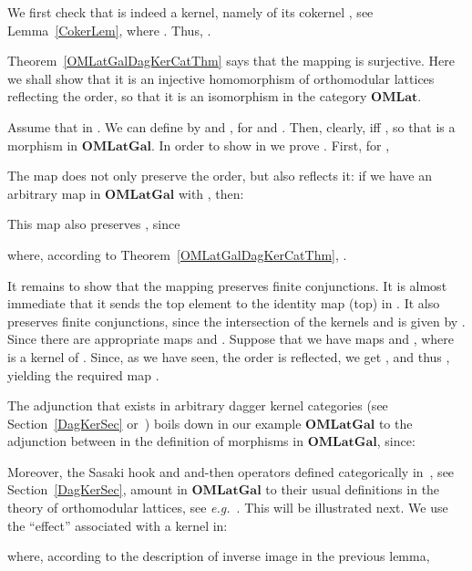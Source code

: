 \documentclass{article}
\newif\ifignore \ignorefalse
\newcommand{\auxproof}[1]{
\ifignore\mbox{}\newline
\textbf{PROOF:} \dotfill\newline
{\it #1}\mbox{}\newline
\textbf{ENDPROOF}\dotfill
\fi}
\newenvironment{proof}[1][Proof]{ \begin{trivlist}\item[\hskip \labelsep {\bfseries #1}]}{ \end{trivlist}}
\newcommand{\QED}{\hspace*{\fill}}
\newcommand{\Cat}[1]{\ensuremath{\mathbf{#1}}}
\begin{document}
\begin{proof}
  We first check that  is indeed a
  kernel, namely of its cokernel , see Lemma~\ref{CokerLem}, where . Thus,
  .

  Theorem~\ref{OMLatGalDagKerCatThm} says that the mapping  is surjective. Here we shall show that it is
  an injective homomorphism of orthomodular lattices reflecting the
  order, so that it is an isomorphism in the category \Cat{OMLat}.

Assume that  in . We can define  by  and , for
 and . Then, clearly,  iff , so that  is a
morphism in \Cat{OMLatGal}. In order to show  in 
we prove . First, for ,


\auxproof{
Similarly, for an arbitrary ,


\noindent The marked equation holds because for arbitrary ,

}

\noindent The map  does not only preserve the
order, but also reflects it: if we have an arbitrary map  in \Cat{OMLatGal} with , then:


\noindent This  map also preserves ,
since


\noindent where, according to Theorem~\ref{OMLatGalDagKerCatThm},
.

It remains to show that the mapping  preserves
finite conjunctions. It is almost immediate that it sends the top
element  to the identity map (top) in . It also
preserves finite conjunctions, since the intersection of the kernels
 and  is given by
. Since  there
are appropriate maps 
and . Suppose that we
have maps  and ,
where  is a kernel of
. Since, as we have seen, the order is
reflected, we get , and thus , yielding the required map . \QED
\end{proof}



The adjunction  that exists in arbitrary
dagger kernel categories (see Section~\ref{DagKerSec}
or~\cite[Proposition~4.3]{HeunenJ09a}) boils down in our example
\Cat{OMLatGal} to the adjunction between  in the
definition of morphisms in \Cat{OMLatGal}, since:


\noindent Moreover, the Sasaki hook  and and-then operators
 defined categorically
in~\cite[Proposition~6.1]{HeunenJ09a}, see Section~\ref{DagKerSec},
amount in \Cat{OMLatGal} to their usual definitions in the theory of
orthomodular lattices, see \textit{e.g.}~\cite{Finch70,Kalmbach83}. This will
be illustrated next.  We use the ``effect''  associated
with a kernel in:


\noindent where, according to the description of inverse image 
 in the previous lemma,
\end{document}
